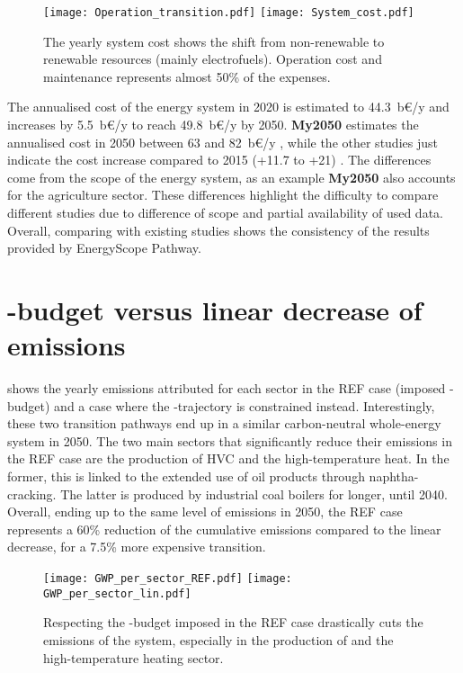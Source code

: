 \begin{figure}[!htbp] %
\centering
\texttt{[image: Operation\_transition.pdf]}
\texttt{[image: System\_cost.pdf]}
\caption{The yearly system cost shows the shift from non-renewable to renewable resources (mainly electrofuels). Operation cost and maintenance represents almost 50\% of the expenses.}
\label{fig:pestd_cumul_op}
\end{figure}

The annualised cost of the energy system in 2020 is estimated to 44.3~b€/y and increases by 5.5~b€/y to reach 49.8~b€/y by 2050. \textbf{My2050} estimates the annualised cost in 2050 between 63 and 82~b€/y \cite{My2050}, while the other studies just indicate the cost increase compared to 2015 (+11.7 to +21) \citep{Devogelaer2013,PATHS2050}. The differences come from the scope of the energy system, as an example \textbf{My2050} also accounts for the agriculture sector. These differences highlight the difficulty to compare different studies due to difference of scope and partial availability of used data. Overall, comparing with existing studies shows the consistency of the results provided by EnergyScope Pathway.

\section{-budget versus linear decrease of emissions}
\label{app:CO2_budget}

 shows the yearly emissions attributed for each sector in the REF case (\ie imposed -budget) and a case where the -trajectory is constrained instead. Interestingly, these two transition pathways end up in a similar carbon-neutral whole-energy system in 2050. The two main sectors that significantly reduce their emissions in the REF case are the production of \gls{HVC} and the high-temperature heat. In the former, this is linked to the extended use of oil products through naphtha-cracking. The latter is produced by industrial coal boilers for longer, until 2040. Overall, ending up to the same level of emissions in 2050, the REF case represents a 60\% reduction of the cumulative emissions compared to the linear decrease, for a 7.5\% more expensive transition.

\begin{figure}[htbp!]
\centering
\texttt{[image: GWP\_per\_sector\_REF.pdf]}
\texttt{[image: GWP\_per\_sector\_lin.pdf]}
\caption{Respecting the -budget imposed in the REF case drastically cuts the emissions of the system, especially in the production of  and the high-temperature heating sector.}
\label{fig:app_CO2_REF_lin}
\end{figure}

